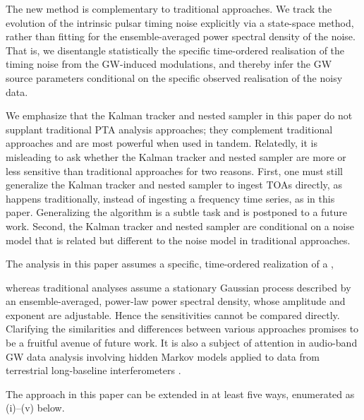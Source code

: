 \documentclass[fleqn,usenatbib,useAMS]{mnras}
\begin{document}
The new method is complementary to traditional approaches. We track the evolution of the intrinsic pulsar timing noise explicitly via a state-space method, rather than fitting for the ensemble-averaged power spectral density of the noise. That is, we disentangle statistically the specific time-ordered realisation of the timing noise from the GW-induced modulations, and thereby infer the GW source parameters conditional on the specific observed realisation of the noisy data. 


 
We emphasize that the Kalman tracker and nested sampler in this paper do not supplant traditional PTA analysis approaches; they complement traditional approaches and are most powerful when used in tandem. Relatedly, it is misleading to ask whether the Kalman tracker and nested sampler are more or less sensitive than traditional approaches for two reasons. First, one must still generalize the Kalman tracker and nested sampler to ingest TOAs directly, as happens traditionally, instead of ingesting a frequency time series, as in this paper. Generalizing the algorithm is a subtle task and is postponed to a future work. Second, the Kalman tracker and nested sampler are conditional on a noise model that is related but different to the noise model in traditional approaches. 

The analysis in this paper assumes a specific, time-ordered realization of a , 


whereas traditional analyses assume a stationary Gaussian process described by an ensemble-averaged, power-law power spectral density, whose amplitude and exponent are adjustable. Hence the sensitivities cannot be compared directly. Clarifying the similarities and differences between various approaches promises to be a fruitful avenue of future work. It is also a subject of attention in audio-band GW data analysis involving hidden Markov models applied to data from terrestrial long-baseline interferometers \citep{PhysRevD.102.023006,PhysRevD.105.022002,Abbott_2022SCO,2022PhRvD.106f2002A}. \newline 



 The approach in this paper can be extended in at least five ways, enumerated as (i)--(v) below. \newline 
 
\end{document}

